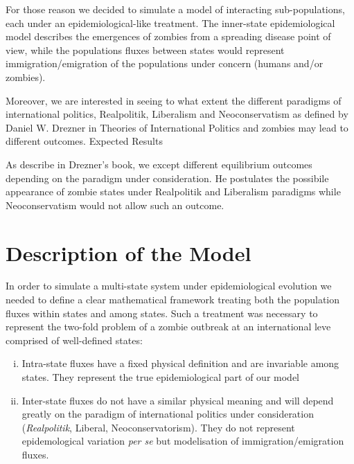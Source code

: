 \documentclass[11pt]{article} %
\begin{document}
For those reason we decided to simulate a model of interacting sub-populations, each under an epidemiological-like treatment. The inner-state epidemiological model describes the emergences of zombies from a spreading disease point of view, while the populations fluxes between states would represent immigration/emigration of the populations under concern (humans and/or zombies). 

Moreover, we are interested in seeing to what extent the different paradigms of international politics, Realpolitik, Liberalism and Neoconservatism as defined by Daniel W. Drezner in Theories of International Politics and zombies may lead to different outcomes.
Expected Results

As describe in Drezner's book, we except different equilibrium outcomes depending on the paradigm under consideration. He postulates the possibile appearance of zombie states under Realpolitik and Liberalism paradigms while Neoconservatism would not allow such an outcome.








\newpage
\section{Description of the Model}\indent

In order to simulate a multi-state system under epidemiological evolution we needed to define a clear mathematical framework treating both the population fluxes within states and among states. Such a treatment was necessary to represent the two-fold problem of a zombie outbreak at an international leve comprised of well-defined states:
\begin{enumerate}[i.]
	\item Intra-state fluxes have a fixed physical definition and are invariable among states. They represent the true epidemiological part of our model
	\item Inter-state fluxes do not have a similar physical meaning and will depend greatly on the paradigm of international politics under consideration (\textit{Realpolitik}, Liberal, Neoconservatorism). They do not represent epidemological variation \textit{per se} but modelisation of immigration/emigration fluxes.
\end{enumerate}
\end{document}
